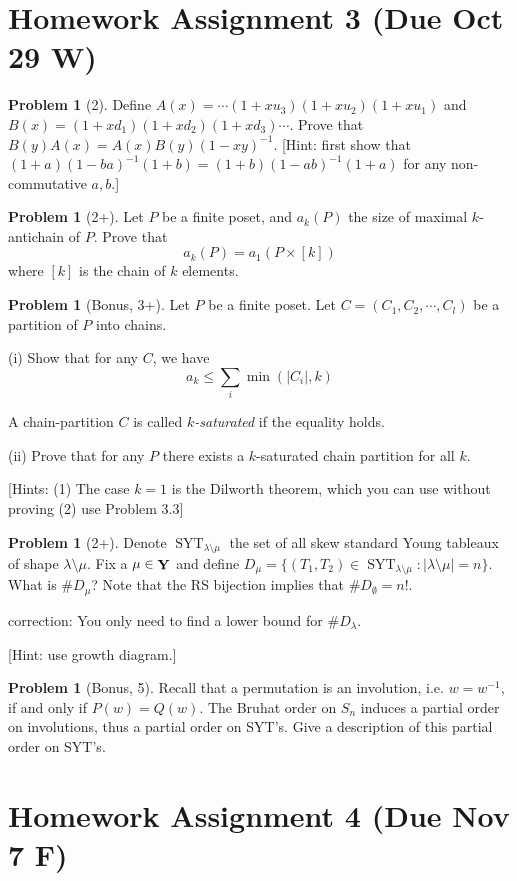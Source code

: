 \documentclass{amsart}
\theoremstyle{plain}
\theoremstyle{definition}
\newtheorem{problem}[theorem]{Problem}
\DeclareMathOperator{\Y}{\bf{Y}}
\DeclareMathOperator{\SYT}{SYT}
\begin{document}
	\section{Homework Assignment 3 (Due Oct 29 W)}
	\begin{problem}[2]
	Define $A(x)=\cdots (1+x u_3)(1+x u_2)(1+x u_1)$ and $B(x)= (1+x d_1)(1+x d_2)(1+x d_3)\cdots$. Prove that $B(y)A(x)=A(x)B(y)(1-xy)^{-1}$. 
	[Hint: first show that $(1+a)(1-ba)^{-1}(1+b)=(1+b)(1-ab)^{-1}(1+a)$ for any non-commutative $a,b$.]
\end{problem}
\begin{problem}[2+]
	Let $P$ be a finite poset, and $a_k(P)$ the size of maximal $k$-antichain of $P$. Prove that
	\[a_k(P)=a_1(P\times[k])\]
	where $[k]$ is the chain of $k$ elements.
\end{problem}
\begin{problem}[Bonus, 3+]
	Let $P$ be a finite poset. Let $C=(C_1,C_2,\cdots,C_l)$ be a partition of $P$ into chains. 
	
	(i) Show that for any $C$, we have
	\[a_k\leq \sum_i \min(|C_i|,k)\]
	
	A chain-partition $C$ is called \emph{$k$-saturated} if the equality  holds. 
	
	(ii) Prove that for any $P$ there exists a $k$-saturated chain partition for all $k$. 
	
	[Hints: (1) The case $k=1$ is the Dilworth theorem, which you can use without proving (2) use Problem 3.3]
\end{problem}
\begin{problem}[2+]
		Denote $\SYT_{\lambda\setminus \mu}$ the set of all skew standard Young tableaux of shape $\lambda\setminus \mu$. Fix a $\mu\in\Y$ and define	\(D_\mu=\{(T_1,T_2)\in \SYT_{\lambda\setminus \mu}:|\lambda\setminus \mu|=n\}\).
		What is $\# D_\mu$? Note that the RS bijection implies that $\# D_{\emptyset}=n!$.
		
		{\color{red}correction: You only need to find a lower bound for $\# D_\lambda$.}
	
	[Hint: use growth diagram.]
	\end{problem}

\begin{problem}[Bonus, 5]
	Recall that a permutation is an involution, i.e. $w=w^{-1}$, if and only if $P(w)=Q(w)$. The Bruhat order on $S_n$ induces a partial order on involutions, thus a partial order on SYT's. Give a description of this partial order on SYT's.
\end{problem}
	\section{Homework Assignment 4 (Due Nov 7 F)}
\end{document}
